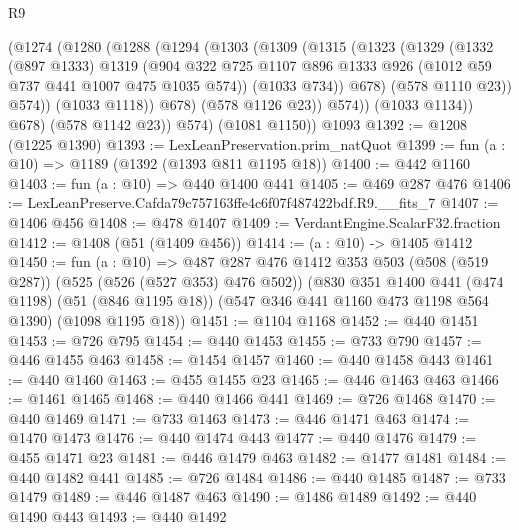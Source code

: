\begin{lexlean}{R9}
\begin{coremodule}
              (@1274
                (@1280
                  (@1288
                    (@1294
                      (@1303
                        (@1309
                          (@1315
                            (@1323
                              (@1329
                                (@1332
                                  (@897 @1333)
                                  @1319
                                  (@904
                                    @322
                                    @725
                                    @1107
                                    @896
                                    @1333
                                    @926
                                    (@1012 @59 @737 @441 @1007 @475 @1035 @574))
                                  (@1033 @734))
                                @678)
                              (@578 @1110 @23))
                            @574))
                        (@1033 @1118))
                      @678)
                    (@578 @1126 @23))
                  @574))
              (@1033 @1134))
            @678)
          (@578 @1142 @23))
        @574)
      (@1081 @1150))
    @1093
@1392 := @1208 (@1225 @1390)
@1393 := LexLeanPreservation.prim_natQuot
@1399 := fun (a : @10) => @1189 (@1392 (@1393 @811 @1195 @18))
@1400 := @442 @1160
@1403 := fun (a : @10) => @440 @1400 @441
@1405 := @469 @287 @476
@1406 := LexLeanPreserve.Cafda79c757163ffe4c6f07f487422bdf.R9.__fits_7
@1407 := @1406 @456
@1408 := @478 @1407
@1409 := VerdantEngine.ScalarF32.fraction
@1412 := @1408 (@51 (@1409 @456))
@1414 := (a : @10) -> @1405 @1412
@1450 := fun (a : @10) =>
  @487
    @287
    @476
    @1412
    @353
    @503
    (@508 (@519 @287))
    (@525 (@526 (@527 @353) @476 @502))
    (@830
      @351
      @1400
      @441
      (@474 @1198)
      (@51 (@846 @1195 @18))
      (@547 @346 @441 @1160 @473 @1198 @564 @1390)
      (@1098 @1195 @18))
@1451 := @1104 @1168
@1452 := @440 @1451
@1453 := @726 @795
@1454 := @440 @1453
@1455 := @733 @790
@1457 := @446 @1455 @463
@1458 := @1454 @1457
@1460 := @440 @1458 @443
@1461 := @440 @1460
@1463 := @455 @1455 @23
@1465 := @446 @1463 @463
@1466 := @1461 @1465
@1468 := @440 @1466 @441
@1469 := @726 @1468
@1470 := @440 @1469
@1471 := @733 @1463
@1473 := @446 @1471 @463
@1474 := @1470 @1473
@1476 := @440 @1474 @443
@1477 := @440 @1476
@1479 := @455 @1471 @23
@1481 := @446 @1479 @463
@1482 := @1477 @1481
@1484 := @440 @1482 @441
@1485 := @726 @1484
@1486 := @440 @1485
@1487 := @733 @1479
@1489 := @446 @1487 @463
@1490 := @1486 @1489
@1492 := @440 @1490 @443
@1493 := @440 @1492

\end{coremodule}
\end{lexlean}
